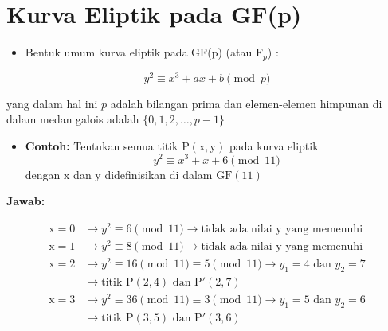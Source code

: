 \documentclass{article}
\begin{document}
\newpage


\section*{Kurva Eliptik pada GF(p)}

\begin{itemize}
    \item Bentuk umum kurva eliptik pada GF(p) (atau $\text{F}_p$) :
\end{itemize}

\[ y^2 \equiv x^3 + ax + b \pmod{p} \]

\vspace{10mm}

yang dalam hal ini $p$ adalah bilangan prima dan elemen-elemen himpunan di dalam medan galois adalah $\{0, 1, 2, \dots, p-1\}$

\newpage


\begin{itemize}
    \item \textbf{Contoh:} Tentukan semua titik $\text{P}(\text{x},\text{y})$ pada kurva eliptik
    \[ y^2 \equiv x^3 + x + 6 \pmod{11} \]
    dengan $\text{x}$ dan $\text{y}$ didefinisikan di dalam $\text{GF}(11)$
\end{itemize}

\textbf{Jawab:}

\begin{align*}
    \text{x} = 0 & \rightarrow y^2 \equiv 6 \pmod{11} \rightarrow \text{tidak ada nilai y yang memenuhi} \\
    \text{x} = 1 & \rightarrow y^2 \equiv 8 \pmod{11} \rightarrow \text{tidak ada nilai y yang memenuhi} \\
    \text{x} = 2 & \rightarrow y^2 \equiv 16 \pmod{11} \equiv 5 \pmod{11} \rightarrow y_1 = 4 \text{ dan } y_2 = 7 \\
    & \rightarrow \text{titik } \text{P}(2,4) \text{ dan } \text{P}'(2,7) \\
    \text{x} = 3 & \rightarrow y^2 \equiv 36 \pmod{11} \equiv 3 \pmod{11} \rightarrow y_1 = 5 \text{ dan } y_2 = 6 \\
    & \rightarrow \text{titik } \text{P}(3,5) \text{ dan } \text{P}'(3,6)
\end{align*}

\newpage

\end{document}

